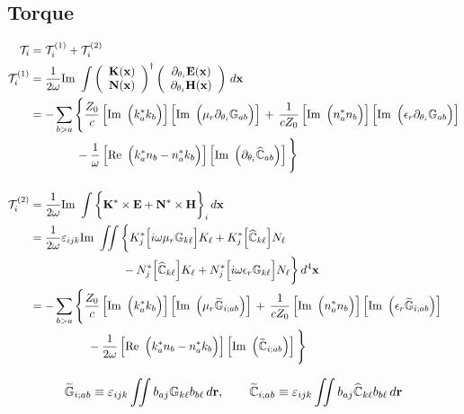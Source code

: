 \documentclass[letterpaper]{article}
\newcommand{\wt}{\widetilde}
\newcommand{\wh}{\widehat}
\newcommand{\whmb}[1]{\widehat{\mb #1}}
\newcommand{\GTiab}{\wt{\mb G}_{i;ab}}
\newcommand{\CTiab}{\wt{\mb C}_{i;ab}}
\newcommand{\ImBig}[1]
 {\left[ \text{Im }\left(\vphantom{\Big(} #1 \right)\right]}
\newcommand{\ReBig}[1]
 {\left[ \text{Re }\left(\vphantom{\Big(} #1 \right)\right]}
\begin{document}
\subsection{Torque}
\begin{align*}
\mc T_i
 &=
\mc T_i^{(1)} + \mc T_i^{(2)}
\\
\mc T_i^{(1)}
&=\frac{1}{2\omega} \text{Im }\int
 \left(\begin{array}{c} \vb K(\vb x) \\ \vb N(\vb x)\end{array}\right)^\dagger
 \left(\begin{array}{c} \partial_{\theta_i} \vb E(\vb x) \\ 
                        \partial_{\theta_i} \vb H(\vb x)\end{array}\right) \,d\vb x
\\
&=-\sum_{b>a}
 \Bigg\{
      \frac{Z_0}{c}
      \ImBig{k_a^* k_b}
      \ImBig{\mu_r \mb \partial_{\theta_i} \mb G_{ab}}
  \,+\,
      \frac{1}{cZ_0}
      \ImBig{n_a^* n_b}
      \ImBig{\epsilon_r \mb \partial_{\theta_i} \mb G_{ab}}
\\
&\qquad\qquad
    -\frac{1}{\omega}
     \ReBig{k_a^* n_b - n_a^* k_b} 
     \ImBig{\partial_{\theta_i} \whmb C_{ab}}
 \Bigg\}
\\[12pt]
\mc T_i^{(2)}
&=\frac{1}{2\omega} \text{Im }\int
  \bigg\{ \vb K^* \times \vb E + \vb N^* \times \vb H \bigg\}_i
  \,d\vb x
\\
&=\frac{1}{2\omega} \varepsilon_{ijk}\text{Im }\iint
  \bigg\{  K^*_j \Big[ i\omega \mu_r \mb G_{k\ell}\Big] K_\ell
          +K^*_j \Big[ \wh{\mb C}_{k\ell}\Big] N_\ell
\\
&\qquad\qquad\qquad\qquad
          -N^*_j \Big[ \wh{\mb C}_{k\ell}\Big] K_\ell
          +N^*_j \Big[ i\omega \epsilon_r \mb G_{k\ell}\Big] 
           N_\ell\bigg\}
  \,d^4 \vb x
\\
&=-\sum_{b>a}
 \Bigg\{
      \frac{Z_0}{c}
      \ImBig{k_a^* k_b} \ImBig{\mu_r \GTiab}
 \,+\,
      \frac{1}{c Z_0}
      \ImBig{n_a^* n_b} \ImBig{\epsilon_r \GTiab}
\\
&\qquad\quad\qquad
     - \frac{1}{2\omega} \ReBig{k_a^* n_b - n_a^* k_b}
       \ImBig{\CTiab}
 \Bigg\}
\end{align*}

$$
 \GTiab
 \equiv \varepsilon_{ijk} \iint b_{aj} \mb G_{k\ell} b_{b\ell} \, d\vb r,
 \qquad 
 \CTiab
 \equiv \varepsilon_{ijk} \iint b_{aj} \whmb C_{k\ell} b_{b\ell} \, d\vb r
$$
\end{document}
